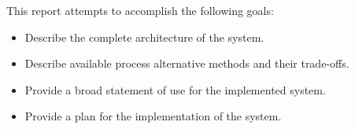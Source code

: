 This report attempts to accomplish the following goals:
\begin{itemize}
    \item Describe the complete architecture of the system.
    \item Describe available process alternative methods and their trade-offs.
    \item Provide a broad statement of use for the implemented system.
    \item Provide a plan for the implementation of the system.
\end{itemize}